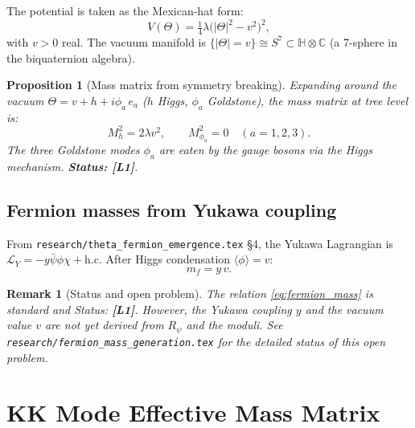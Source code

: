 \documentclass[11pt,a4paper]{article}
\newtheorem{proposition}{Proposition}
\newtheorem{remark}{Remark}
\begin{document}
The potential is taken as the Mexican-hat form:
\begin{equation}
\label{eq:potential}
  V(\Theta) = \tfrac{1}{4}\lambda\bigl(|\Theta|^2 - v^2\bigr)^2,
\end{equation}
with $v > 0$ real.  The vacuum manifold is
$\{|\Theta| = v\} \cong S^7 \subset \mathbb{H}\otimes\mathbb{C}$
(a 7-sphere in the biquaternion algebra).

\begin{proposition}[Mass matrix from symmetry breaking]\label{prop:mass_matrix}
  Expanding around the vacuum $\Theta = v + h + i\phi_a\, e_a$
  ($h$ Higgs, $\phi_a$ Goldstone), the mass matrix at tree level is:
  \begin{equation}
  \label{eq:mass_matrix}
    M_h^2 = 2\lambda v^2, \qquad M_{\phi_a}^2 = 0 \quad (a=1,2,3).
  \end{equation}
  The three Goldstone modes $\phi_a$ are eaten by the gauge bosons via the
  Higgs mechanism.
  \textbf{Status: [L1]}.
\end{proposition}

\subsection{Fermion masses from Yukawa coupling}

From \texttt{research/theta\_fermion\_emergence.tex} §4, the Yukawa
Lagrangian is $\mathcal{L}_Y = -y\bar\psi\phi\chi + \mathrm{h.c.}$
After Higgs condensation $\langle\phi\rangle = v$:
\begin{equation}
\label{eq:fermion_mass}
  m_f = y\,v.
\end{equation}

\begin{remark}[Status and open problem]
  The relation \eqref{eq:fermion_mass} is standard and Status: \textbf{[L1]}.
  However, the Yukawa coupling $y$ and the vacuum value $v$ are not yet
  derived from $R_\psi$ and the moduli.  See \texttt{research/fermion\_mass\_generation.tex}
  for the detailed status of this open problem.
\end{remark}

\section{KK Mode Effective Mass Matrix}
\label{sec:kk_mass_matrix}
\end{document}
